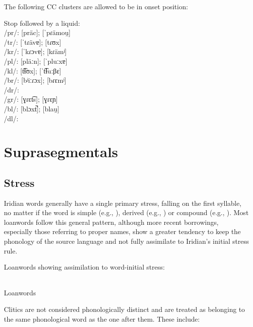 \par The following CC clusters are allowed to be in onset position:

\pex
\a Stop followed by a liquid:\\
/pr/:  [pr\"ac];  [ˈpɾämou̯]\\
/tr/:  [ˈtɾävɐ];  [tɾʊx]\\
/kr/:  [ˈkɾɔvɐ];  [kɾämʲ]\\
/pl/:  [pläːn];  [ˈpluːxɐ]\\
/kl/:  [t͡ɬʊx];  [ˈt͡ɬuːβɛ]\\
/br/:  [bʲiːɾɔx];  [bɾɛmʲ]\\
/dr/: \\
/gr/:  [ɣɾɛt͡s];  [ɣɾɛɲ]\\
/bl/:  [blɔxt̚];  [blau̯]\\
/dl/:
\xe

\section{Suprasegmentals}

\subsection{Stress} Iridian words generally have a single primary
stress, falling on the first syllable, no matter if the word is simple (e.g.,
), derived (e.g., ) or
compound (e.g., ). Most loanwords follow this
general pattern, although more recent borrowings, especially those referring to
proper names, show a greater tendency to keep the phonology of the source
language and not fully assimilate to Iridian's initial stress rule.

\pex
\a Loanwords showing assimilation to word-initial stress:\\
\\

\a Loanwords
\xe

Clitics are not considered phonologically distinct and are treated
as belonging to the same phonological word as the one after them. These include:

